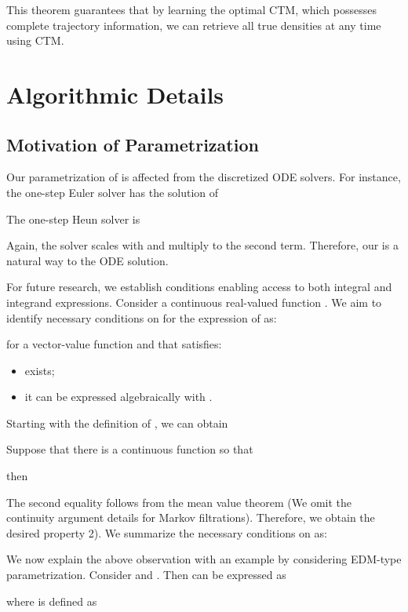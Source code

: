 \documentclass{article} \usepackage{iclr2024_coNFErence,times}
\newcommand{\djk}[1]{{\color{black}{{#1}}}}
\theoremstyle{definition}
\theoremstyle{remark}
\begin{document}
This theorem guarantees that by learning the optimal CTM, which possesses complete trajectory information, we can retrieve all true densities at any time using CTM.








\section{Algorithmic Details}

\subsection{Motivation of Parametrization}\label{sec:parametrization}

Our parametrization of  is affected from the discretized ODE solvers. For instance, the one-step Euler solver has the solution of

The one-step Heun solver is

Again, the solver scales  with  and multiply  to the second term. Therefore, our  is a natural way to \djk{represent} the ODE solution.

For future research, we establish conditions enabling access to both integral and integrand expressions. Consider a continuous real-valued function . We aim to identify necessary conditions on  for the expression of  as:

for a vector-value function  and that  satisfies:
\begin{itemize}
    \item  exists;
    \item it can be expressed algebraically with .
\end{itemize}
Starting with the definition of , we can obtain



Suppose that there is a continuous function  so that 

then 

The second equality follows from the mean value theorem (We omit the continuity argument details for Markov filtrations). Therefore, we obtain the desired property 2). We summarize the necessary conditions on  as:



We now explain the above observation with an example by considering EDM-type parametrization. Consider  and . Then  can be expressed as 

where  is defined as 
\end{document}
